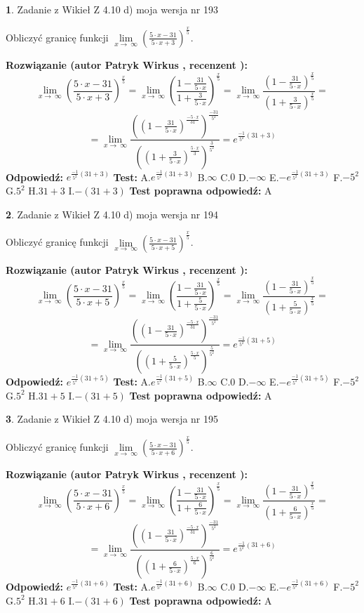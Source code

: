 \documentclass[12pt, a4paper]{article}
\theoremstyle{definition} %
\newtheorem{zad}{}
\newcommand{\zadStart}[1]{\begin{zad}#1\newline}
\newcommand{\zadStop}{\end{zad}}
\newcommand{\rozwStart}[2]{\noindent \textbf{Rozwiązanie (autor #1 , recenzent #2): }\newline}
\newcommand{\rozwStop}{\newline}
\newcommand{\odpStart}{\noindent \textbf{Odpowiedź:}\newline}
\newcommand{\odpStop}{\newline}
\newcommand{\testStart}{\noindent \textbf{Test:}\newline}
\newcommand{\testStop}{\newline}
\newcommand{\kluczStart}{\noindent \textbf{Test poprawna odpowiedź:}\newline}
\newcommand{\kluczStop}{\newline}
\begin{document}
\zadStart{Zadanie z Wikieł Z 4.10 d) moja wersja nr 193}


Obliczyć granicę funkcji  $\lim\limits_{x\to\ \infty}(\frac{5\cdot x-31}{5\cdot x+3})^{\frac{x}{5}}$.
\zadStop
\rozwStart{Patryk Wirkus}{}
$$\lim\limits_{x\to\ \infty}(\frac{5\cdot x-31}{5\cdot x+3})^{\frac{x}{5}} = \lim\limits_{x\to\ \infty}(\frac{1-\frac{31}{5\cdot x}}{1+\frac{3}{5\cdot x}})^{\frac{x}{5}}=\lim\limits_{x\to\ \infty}\frac{(1-\frac{31}{5\cdot x})^{\frac{x}{5}}}{(1+\frac{3}{5\cdot x})^{\frac{x}{5}}}=$$
$$=\lim\limits_{x\to\ \infty}\frac{((1-\frac{31}{5\cdot x})^{\frac{-5\cdot x}{31}})^{\frac{-31}{5^{2}}}}{((1+\frac{3}{5\cdot x})^{\frac{5\cdot x}{3}})^{\frac{3}{5^{2}}}}=e^{\frac{-1}{5^{2}}(31+3)}$$
\rozwStop
\odpStart
$e^{\frac{-1}{5^{2}}(31+3)}$
\odpStop
\testStart
A.$e^{\frac{-1}{5^{2}}(31+3)}$ B.$\infty$ C.$0$ D.$-\infty$ E.$-e^{\frac{-1}{5^{2}}(31+3)}$
F.$-5^{2}$ G.$5^{2}$
H.$31+3$
I.$-(31+3)$
\testStop
\kluczStart
A
\kluczStop



\zadStart{Zadanie z Wikieł Z 4.10 d) moja wersja nr 194}


Obliczyć granicę funkcji  $\lim\limits_{x\to\ \infty}(\frac{5\cdot x-31}{5\cdot x+5})^{\frac{x}{5}}$.
\zadStop
\rozwStart{Patryk Wirkus}{}
$$\lim\limits_{x\to\ \infty}(\frac{5\cdot x-31}{5\cdot x+5})^{\frac{x}{5}} = \lim\limits_{x\to\ \infty}(\frac{1-\frac{31}{5\cdot x}}{1+\frac{5}{5\cdot x}})^{\frac{x}{5}}=\lim\limits_{x\to\ \infty}\frac{(1-\frac{31}{5\cdot x})^{\frac{x}{5}}}{(1+\frac{5}{5\cdot x})^{\frac{x}{5}}}=$$
$$=\lim\limits_{x\to\ \infty}\frac{((1-\frac{31}{5\cdot x})^{\frac{-5\cdot x}{31}})^{\frac{-31}{5^{2}}}}{((1+\frac{5}{5\cdot x})^{\frac{5\cdot x}{5}})^{\frac{5}{5^{2}}}}=e^{\frac{-1}{5^{2}}(31+5)}$$
\rozwStop
\odpStart
$e^{\frac{-1}{5^{2}}(31+5)}$
\odpStop
\testStart
A.$e^{\frac{-1}{5^{2}}(31+5)}$ B.$\infty$ C.$0$ D.$-\infty$ E.$-e^{\frac{-1}{5^{2}}(31+5)}$
F.$-5^{2}$ G.$5^{2}$
H.$31+5$
I.$-(31+5)$
\testStop
\kluczStart
A
\kluczStop



\zadStart{Zadanie z Wikieł Z 4.10 d) moja wersja nr 195}


Obliczyć granicę funkcji  $\lim\limits_{x\to\ \infty}(\frac{5\cdot x-31}{5\cdot x+6})^{\frac{x}{5}}$.
\zadStop
\rozwStart{Patryk Wirkus}{}
$$\lim\limits_{x\to\ \infty}(\frac{5\cdot x-31}{5\cdot x+6})^{\frac{x}{5}} = \lim\limits_{x\to\ \infty}(\frac{1-\frac{31}{5\cdot x}}{1+\frac{6}{5\cdot x}})^{\frac{x}{5}}=\lim\limits_{x\to\ \infty}\frac{(1-\frac{31}{5\cdot x})^{\frac{x}{5}}}{(1+\frac{6}{5\cdot x})^{\frac{x}{5}}}=$$
$$=\lim\limits_{x\to\ \infty}\frac{((1-\frac{31}{5\cdot x})^{\frac{-5\cdot x}{31}})^{\frac{-31}{5^{2}}}}{((1+\frac{6}{5\cdot x})^{\frac{5\cdot x}{6}})^{\frac{6}{5^{2}}}}=e^{\frac{-1}{5^{2}}(31+6)}$$
\rozwStop
\odpStart
$e^{\frac{-1}{5^{2}}(31+6)}$
\odpStop
\testStart
A.$e^{\frac{-1}{5^{2}}(31+6)}$ B.$\infty$ C.$0$ D.$-\infty$ E.$-e^{\frac{-1}{5^{2}}(31+6)}$
F.$-5^{2}$ G.$5^{2}$
H.$31+6$
I.$-(31+6)$
\testStop
\kluczStart
A
\kluczStop
\end{document}
